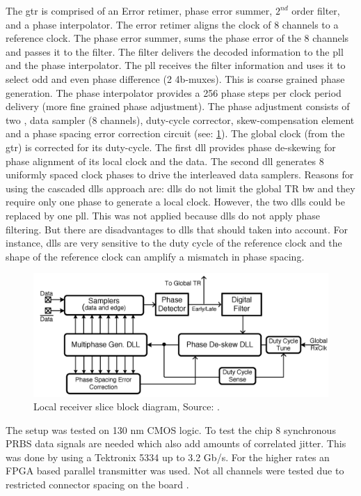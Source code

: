 The \ac{gtr} is comprised of an Error retimer, phase error summer, $2^{nd}$ order filter,  and a phase interpolator.
The error retimer aligns the clock of 8 channels to a reference clock.
The phase error summer, sums the phase error of the 8 channels and passes it to the filter.
The filter delivers the decoded information to the \ac{pll} and the phase interpolator.
The \ac{pll} receives the filter information and uses it to select odd and even phase difference (2 4b-muxes).
This is coarse grained phase generation.
The phase interpolator provides a 256 phase steps per clock period delivery (more fine grained phase adjustment).
The phase adjustment consists of two , data sampler (8 channels), duty-cycle corrector, skew-compensation element and a phase spacing error correction circuit (see: \cref{fig:rep1:receiver}).
The global clock (from the \ac{gtr}) is corrected for its duty-cycle.
The first \ac{dll} provides phase de-skewing for phase alignment of its local clock and the data.
The second \ac{dll} generates 8 uniformly spaced clock phases to drive the interleaved data samplers.
Reasons for using the cascaded \acsp{dll} approach are: \acsp{dll} do not limit the global TR \ac{bw} and they require only one phase to generate a local clock.
However, the two \acsp{dll} could be replaced by one \ac{pll}.
This was not applied because \acsp{dll} do not apply phase filtering. 
But there are disadvantages to \acsp{dll} that should taken into account.
For instance, \acsp{dll} are very sensitive to the duty cycle of the reference clock and the shape of the reference clock can amplify a mismatch in phase spacing.

\begin{figure}	
    \centering
	\includegraphics[width=0.99\linewidth]{Figures/Rep1ReceiverSlice.png}
	\caption{Local receiver slice block diagram, Source: \cite{agrawal20098}.} 
    \label{fig:rep1:receiver}
\end{figure}
The setup was tested on 130 nm CMOS logic. 
To test the chip 8 synchronous PRBS data signals are needed which also add amounts of correlated jitter.
This was done by using a Tektronix 5334 up to 3.2 Gb/s.
For the higher rates an FPGA based parallel transmitter was used.
Not all channels were tested due to restricted connector spacing on the board .

